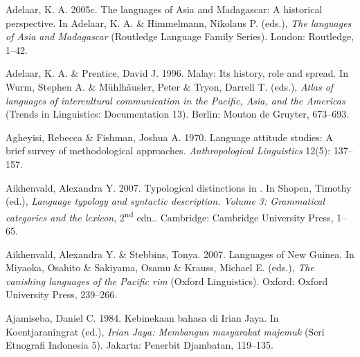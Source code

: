 \begin{styleCitaviBibliographyEntry}
Adelaar, K. A. 2005c. The  languages of Asia and Madagascar: A historical perspective. In Adelaar, K. A. \& Himmelmann, Nikolaus P. (eds.), \textit{The  languages of Asia and Madagascar} (Routledge Language Family Series). London: Routledge, 1–42.
\end{styleCitaviBibliographyEntry}

\begin{styleCitaviBibliographyEntry}
Adelaar, K. A. \& Prentice, David J. 1996. Malay: Its history, role and spread. In Wurm, Stephen A. \& Mühlhäusler, Peter \& Tryon, Darrell T. (eds.), \textit{Atlas of languages of intercultural communication in the Pacific, Asia, and the Americas} (Trends in Linguistics: Documentation 13). Berlin: Mouton de Gruyter, 673–693.
\end{styleCitaviBibliographyEntry}

\begin{styleCitaviBibliographyEntry}
Agheyisi, Rebecca \& Fishman, Joshua A. 1970. Language attitude studies: A brief survey of methodological approaches. \textit{Anthropological Linguistics} 12(5): 137–157.
\end{styleCitaviBibliographyEntry}

\begin{styleCitaviBibliographyEntry}
Aikhenvald, Alexandra Y. 2007. Typological distinctions in . In Shopen, Timothy (ed.), \textit{Language typology and syntactic description. Volume 3: Grammatical categories and the lexicon}, 2\textsuperscript{nd} edn.. Cambridge: Cambridge University Press, 1–65.
\end{styleCitaviBibliographyEntry}

\begin{styleCitaviBibliographyEntry}
Aikhenvald, Alexandra Y. \& Stebbins, Tonya. 2007. Languages of New Guinea. In Miyaoka, Osahito \& Sakiyama, Osamu \& Krauss, Michael E. (eds.), \textit{The vanishing languages of the Pacific rim} (Oxford Linguistics). Oxford: Oxford University Press, 239–266.
\end{styleCitaviBibliographyEntry}

\begin{styleCitaviBibliographyEntry}
Ajamiseba, Daniel C. 1984. Kebinekaan bahasa di Irian Jaya. In Koentjaraningrat (ed.), \textit{Irian Jaya: Membangun masyarakat majemuk} (Seri Etnografi Indonesia 5). Jakarta: Penerbit Djambatan, 119–135.
\end{styleCitaviBibliographyEntry}

